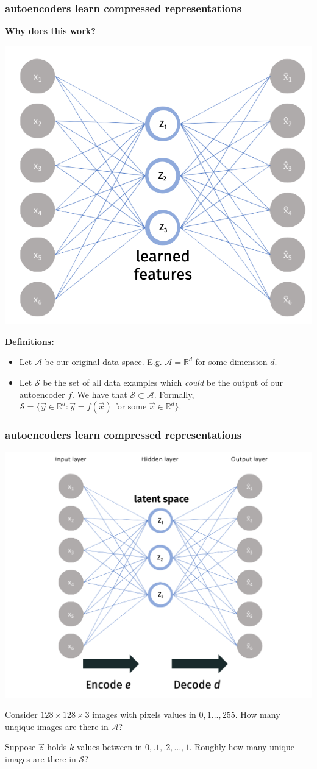 \documentclass[handout,compress]{beamer}
\newcommand{\R}{\mathbb{R}}
\begin{document}
\begin{frame}
	\frametitle{autoencoders learn compressed representations}
	\small
	\begin{center}
	\textbf{Why does this work?}
	
	\includegraphics[width=.4\textwidth]{bottleneck.png}
	\end{center}
\vspace{-1.5em}
\textbf{Definitions:}
\begin{itemize}
	\item Let $\mathcal{A}$ be our original data space. E.g. $\mathcal{A} = \R^d$ for some dimension $d$. 
	
	\item Let $\mathcal{S}$ be the set of all data examples which \emph{could} be the output of our autoencoder $f$. We have that $\mathcal{S} \subset \mathcal{A}$. Formally,  $\mathcal{S} = \{\vec{y} \in \R^d: \vec{y} = f(\vec{x}) \text{ for some } \vec{x}\in \R^d\}$.
\end{itemize}

\end{frame}

\begin{frame}
	\small
	\frametitle{autoencoders learn compressed representations}
	\begin{center}
		\includegraphics[width=.5\textwidth]{labeled_bottleneck.png}
	\end{center}
\vspace{-1em}
	Consider $128\times 128 \times 3$ images with pixels values in $0, 1 \ldots, 255$. How many unqique images are there in $\mathcal{A}$?\vspace{2em}
	
	Suppose $\vec{z}$ holds $k$ values between in $0,.1,.2,\ldots, 1$. Roughly how many unique images are there in $\mathcal{S}$?
\end{frame}
\end{document}
